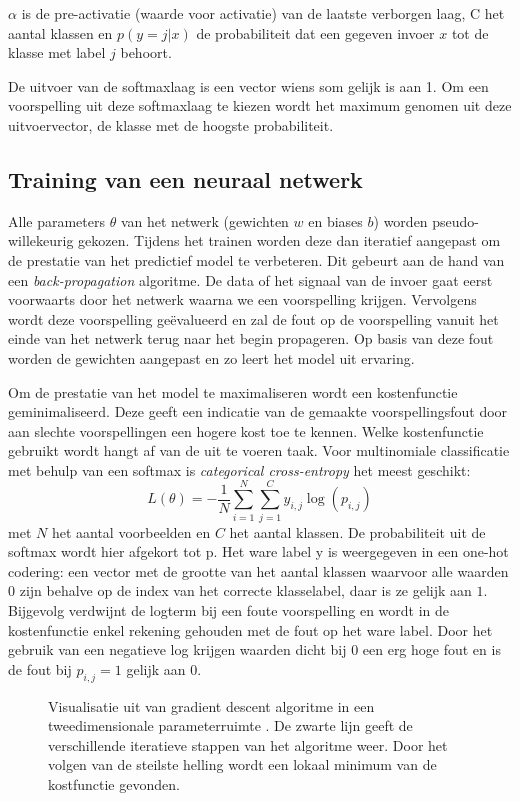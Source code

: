 \npar $\alpha$ is de pre-activatie (waarde voor activatie) van de laatste verborgen laag, C het aantal klassen en $p(y=j|x)$ de probabiliteit dat een gegeven invoer $x$ tot de klasse met label $j$ behoort.

\npar De uitvoer van de softmaxlaag is een vector wiens som gelijk is aan 1. Om een voorspelling uit deze softmaxlaag te kiezen wordt het maximum genomen uit deze uitvoervector, de klasse met de hoogste probabiliteit. 

\subsection{Training van een neuraal netwerk}\label{sec:leren}
Alle parameters $\theta$ van het netwerk (gewichten $w$ en biases $b$) worden pseudo-willekeurig gekozen. Tijdens het trainen worden deze dan iteratief aangepast om de prestatie van het predictief model te verbeteren. Dit gebeurt aan de hand van een \textit{back-propagation} algoritme. De data of het signaal van de invoer gaat eerst voorwaarts door het netwerk waarna we een voorspelling krijgen. Vervolgens wordt deze voorspelling ge\"evalueerd en zal de fout op de voorspelling vanuit het einde van het netwerk terug naar het begin propageren. Op basis van deze fout worden de gewichten aangepast en zo leert het model uit ervaring.

\npar Om de prestatie van het model te maximaliseren wordt een kostenfunctie geminimaliseerd. Deze geeft een indicatie van de gemaakte voorspellingsfout door aan slechte voorspellingen een hogere kost toe te kennen. Welke kostenfunctie gebruikt wordt hangt af van de uit te voeren taak. Voor multinomiale classificatie met behulp van een softmax is \textit{categorical cross-entropy} het meest geschikt:
\begin{equation}
L(\theta) = - \frac{1}{N}\sum_{i=1}^{N}\sum_{j=1}^{C}y_{i,j}\log(p_{i,j})
\end{equation}
met $N$ het aantal voorbeelden en $C$ het aantal klassen. De probabiliteit uit de softmax wordt hier afgekort tot p. Het ware label y is weergegeven in een one-hot codering: een vector met de grootte van het aantal klassen waarvoor alle waarden $0$ zijn behalve op de index van het correcte klasselabel, daar is ze gelijk aan $1$. Bijgevolg verdwijnt de logterm bij een foute voorspelling en wordt in de kostenfunctie enkel rekening gehouden met de fout op het ware label. Door het gebruik van een negatieve log krijgen waarden dicht bij $0$ een erg hoge fout en is de fout bij $p_{i,j}=1$ gelijk aan $0$. 
\begin{figure}[!t]
	\centering
	\def\svgwidth{0.6\columnwidth}
	
	\caption{Visualisatie uit \cite{andrew_ng} van gradient descent algoritme in een tweedimensionale parameterruimte . De zwarte lijn geeft de verschillende iteratieve stappen van het algoritme weer. Door het volgen van de steilste helling wordt een lokaal minimum van de kostfunctie gevonden.}
	\label{fig:gradient-descent}
\end{figure}
